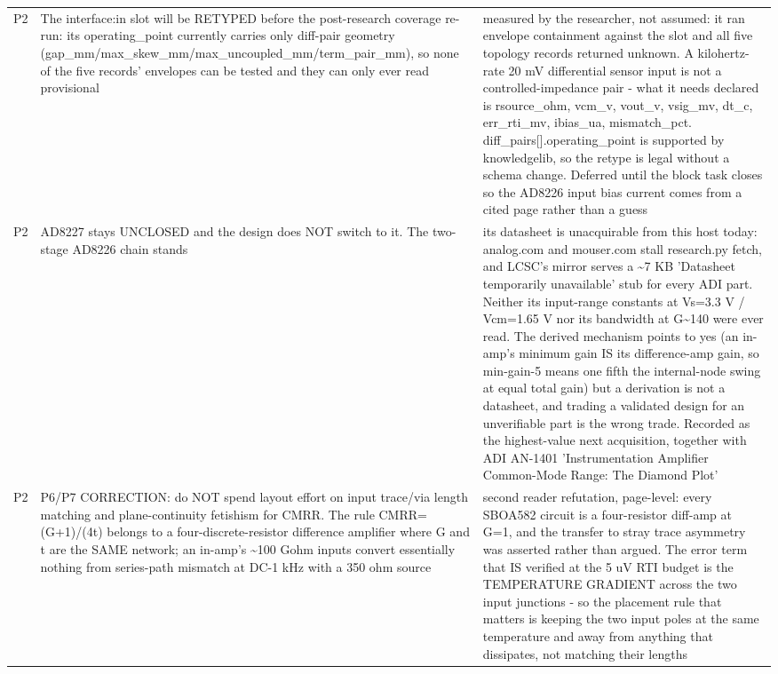 \documentclass[11pt,a4paper]{article}
\begin{document}
{\begin{longtable}{lp{5.2cm}p{7.2cm}}
P2 & The interface:in slot will be RETYPED before the post-research coverage re-run: its operating\_point currently carries only diff-pair geometry (gap\_mm/max\_skew\_mm/max\_uncoupled\_mm/term\_pair\_mm), so none of the five records' envelopes can be tested and they can only ever read provisional & measured by the researcher, not assumed: it ran envelope containment against the slot and all five topology records returned unknown. A kilohertz-rate 20 mV differential sensor input is not a controlled-impedance pair - what it needs declared is rsource\_ohm, vcm\_v, vout\_v, vsig\_mv, dt\_c, err\_rti\_mv, ibias\_ua, mismatch\_pct. diff\_pairs{[}{]}.operating\_point is supported by knowledgelib, so the retype is legal without a schema change. Deferred until the block task closes so the AD8226 input bias current comes from a cited page rather than a guess \\
P2 & AD8227 stays UNCLOSED and the design does NOT switch to it. The two-stage AD8226 chain stands & its datasheet is unacquirable from this host today: analog.com and mouser.com stall research.py fetch, and LCSC's mirror serves a \textasciitilde{}7 KB 'Datasheet temporarily unavailable' stub for every ADI part. Neither its input-range constants at Vs=3.3 V / Vcm=1.65 V nor its bandwidth at G\textasciitilde{}140 were ever read. The derived mechanism points to yes (an in-amp's minimum gain IS its difference-amp gain, so min-gain-5 means one fifth the internal-node swing at equal total gain) but a derivation is not a datasheet, and trading a validated design for an unverifiable part is the wrong trade. Recorded as the highest-value next acquisition, together with ADI AN-1401 'Instrumentation Amplifier Common-Mode Range: The Diamond Plot' \\
P2 & P6/P7 CORRECTION: do NOT spend layout effort on input trace/via length matching and plane-continuity fetishism for CMRR. The rule CMRR=(G+1)/(4t) belongs to a four-discrete-resistor difference amplifier where G and t are the SAME network; an in-amp's \textasciitilde{}100 Gohm inputs convert essentially nothing from series-path mismatch at DC-1 kHz with a 350 ohm source & second reader refutation, page-level: every SBOA582 circuit is a four-resistor diff-amp at G=1, and the transfer to stray trace asymmetry was asserted rather than argued. The error term that IS verified at the 5 uV RTI budget is the TEMPERATURE GRADIENT across the two input junctions - so the placement rule that matters is keeping the two input poles at the same temperature and away from anything that dissipates, not matching their lengths \\

\end{longtable}}
\end{document}
